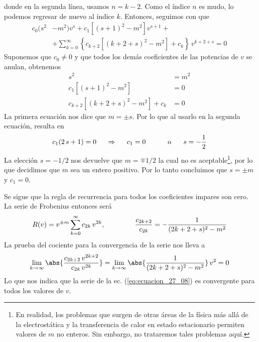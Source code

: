 donde en la segunda línea, usamos $n = k -2$. Como el índice $n$ es mudo, lo podemos regresar de nuevo al índice $k$. Entonces, seguimos con que
\begin{align*}
c_{0}(s^{2} &- m^{2}) v^{s} + c_{1} [(s + 1)^{2}- m^{2}] v^{s+1} + \\
&+ \sum_{k=0}^{\infty} \left\{ c_{k+2} [(k + 2 + s)^{2} - m^{2}] + c_{k} \right\} \, v^{k+2+s} = 0
\end{align*}
Suponemos que $c_{0} \neq 0$ y que todos los demás coeficientes de las potencias de $v$ se anulan, obtenemos
\begin{align*}
s^{2} &= m^{2} \\
c_{1} [(s + 1)^{2}- m^{2}] &= 0\\
c_{k+2} [(k + 2 + s)^{2} - m^{2}] + c_{k} &= 0
\end{align*}
La primera ecuación nos dice que $m = \pm s$. Por lo que al usarlo en la segunda ecuación, resulta en
\begin{align*}
c_{1} (2 \, s + 1) = 0 \hspace{0.5cm} \Rightarrow \hspace{0.5cm} c_{1} = 0 \hspace{1cm} \mbox{ o } \hspace{0.5cm} s = - \dfrac{1}{2}
\end{align*}
La elección $s = -1/2$ nos devuelve que $m = \mp 1/2$ la cual no es aceptable\footnote{En realidad, los problemas que surgen de otras áreas de la física más allá de la electrostática y la transferencia de calor en estado estacionario permiten valores de $m$ no enteros. Sin embargo, no trataremos tales problemas aquí.}, por lo que decidimos que $m$ sea un entero positivo. Por lo tanto concluimos que $s = \pm m$ y $c_{1} = 0$. 
\par
Se sigue que la regla de recurrencia para todos los coeficientes impares son cero. La serie de Frobenius entonces será
\begin{equation}
R(v) = v^{\pm m} \sum_{k=0}^{\infty} c_{2k} \, v^{2k}, \hspace{1.5cm} \dfrac{c_{2k+2}}{c_{2k}} = - \dfrac{1}{(2k + 2 + s)^{2} - m^{2}}
\label{eq:ecuacion_27_08}
\end{equation}
La prueba del cociente para la convergencia de la serie nos lleva a
\begin{align*}
\lim_{k \to \infty} \abs{\dfrac{c_{2k+2} \, v^{2k+2}}{c_{2k} \, v^{2k}}} = \lim_{k \to \infty} \abs{\dfrac{1}{(2k + 2 + s)^{2} -m^{2}}} \, v^{2} = 0
\end{align*}
Lo que nos indica que la serie de la ec. (\ref{eq:ecuacion_27_08}) es convergente para todos los valores de $v$.
